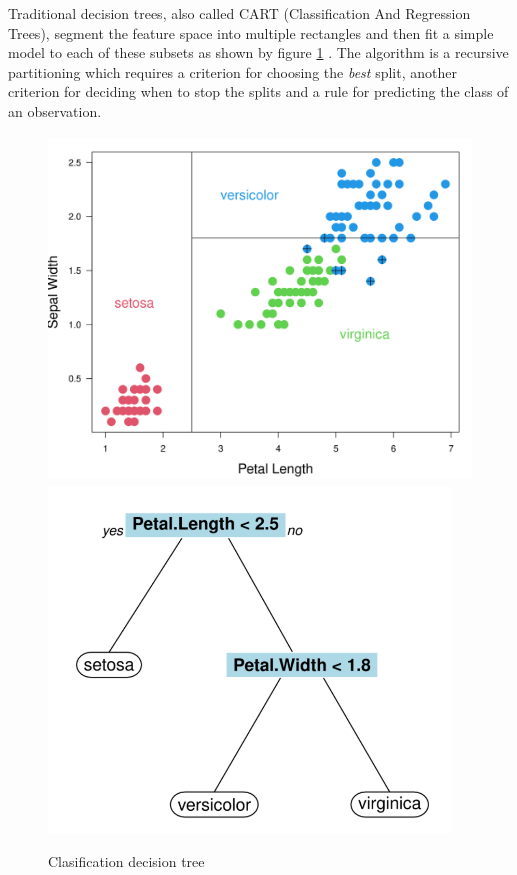 \documentclass[
]{book}
\begin{document}
Traditional decision trees, also called CART (Classification And Regression Trees), segment the feature space into multiple rectangles and then fit a simple model to each of these subsets as shown by figure \ref{fig:tree} \citep{ML_TREE}. The algorithm is a recursive partitioning which requires a criterion for choosing the \emph{best} split, another criterion for deciding when to stop the splits and a rule for predicting the class of an observation.

\begin{figure}

{\centering \includegraphics[width=0.45\linewidth,height=260pt]{./imgs/tree1} \includegraphics[width=0.45\linewidth,height=260pt]{./imgs/tree2} 

}

\caption{Clasification decision tree}\label{fig:tree}
\end{figure}
\end{document}
